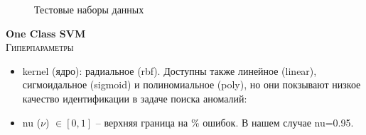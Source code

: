 \documentclass[12pt]{article}
\begin{document}
    \begin{figure}[h!]
        \centering
        \caption{Тестовые наборы данных}
        \label{sec:Research:Model:Visualization:fig:featueres}
    \end{figure}


    \textbf{One Class SVM} \\

    \noindent \textsc{Гиперпараметры}
    \begin{itemize}
        \item kernel (ядро): радиальное (rbf). Доступны также линейное (linear), сигмоидальное (sigmoid) и полиномиальное (poly), но они покзывают низкое качество идентификации в задаче поиска аномалий:
        \item nu ($\nu$) $\in [0, 1]$ – верхняя граница на \% ошибок. В нашем случае nu=0.95.
    \end{itemize}
\end{document}
